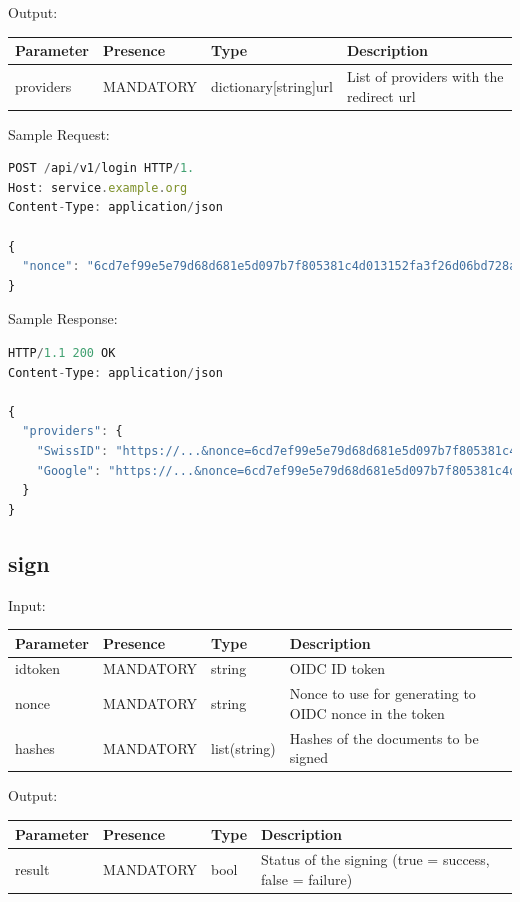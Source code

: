 Output:

\begin{tabular}{|l|l|l|l|}
	\hline
	Parameter & Presence & Type & Description \\ \hline
	providers & MANDATORY & dictionary[string]url & List of providers with the redirect url \\ \hline
\end{tabular}

Sample Request:
\begin{lstlisting}[caption={login request}, captionpos=b, language=JavaScript, label={lst:loginrequest}]
POST /api/v1/login HTTP/1.
Host: service.example.org
Content-Type: application/json

{
  "nonce": "6cd7ef99e5e79d68d681e5d097b7f805381c4d013152fa3f26d06bd728ae49fa"
}
\end{lstlisting}

Sample Response:

\begin{lstlisting}[caption={login response}, captionpos=b, language=JavaScript, label={lst:loginresponse}]
HTTP/1.1 200 OK
Content-Type: application/json

{
  "providers": {
    "SwissID": "https://...&nonce=6cd7ef99e5e79d68d681e5d097b7f805381c4d013152fa3f26d06bd728ae49fa",
    "Google": "https://...&nonce=6cd7ef99e5e79d68d681e5d097b7f805381c4d013152fa3f26d06bd728ae49fa"
  }
}
\end{lstlisting}

\subsection{sign}
Input:

\begin{tabular}{|l|l|l|l|}
	\hline
	Parameter & Presence & Type & Description \\ \hline
	idtoken & MANDATORY & string & OIDC ID token \\ \hline
	nonce & MANDATORY & string & Nonce to use for generating to OIDC nonce in the token \\ \hline
	hashes & MANDATORY & list(string) & Hashes of the documents to be signed \\ \hline
\end{tabular}

Output:

\begin{tabular}{|l|l|l|l|}
	\hline
	Parameter & Presence & Type & Description \\ \hline
	result & MANDATORY & bool & Status of the signing (true = success, false = failure) \\ \hline
\end{tabular}


